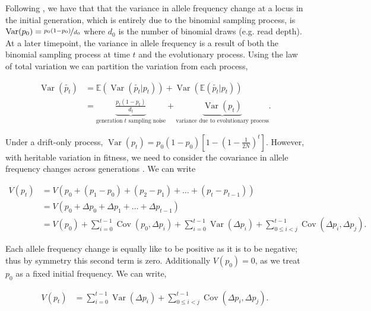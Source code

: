 \documentclass[11pt]{article}
\newcommand{\E}{\mathbb{E}}
\DeclareMathOperator{\var}{Var}
\DeclareMathOperator{\cov}{Cov}
\begin{document}
Following \textcite{Waples1989-sj}, we have that that the variance in allele
frequency change at a locus in the initial generation, which is entirely due to
the binomial sampling process, is $\var(p_0) = \nicefrac{p_0(1-p_0)}{d_0}$
where $d_0$ is the number of binomial draws (e.g. read depth). At a later
timepoint, the variance in allele frequency is a result of both the binomial
sampling process at time $t$ and the evolutionary process. Using the law of
total variation we can partition the variation from each process,

\begin{align}
  \var(\widetilde{p_t}) &= \E(\var(\widetilde{p_t} | p_t)) + \var(\E(\widetilde{p_t}|p_t)) \\
                        &= \underbrace{\frac{p_t(1-p_t)}{d_t}}_\text{generation $t$ sampling noise} + \underbrace{\var(p_t)}_\text{variance due to evolutionary process}.
\end{align}

Under a drift-only process, $\var(p_t) = p_0(1-p_0)\left[1- \left(1 -
\frac{1}{2N}\right)^t\right]$. However, with heritable variation in fitness, we
need to consider the covariance in allele frequency changes across generations
\parencite{Buffalo2019-io}. We can write

\begin{align}
  V(p_t) &= V\left(p_0 + (p_1 - p_0) + (p_2 - p_1) + \ldots + (p_t - p_{t-1}) \right) \\
         &= V\left(p_0 + \Delta p_0 + \Delta p_1 + \ldots + \Delta p_{t-1} \right) \\
         &= V(p_0) + \sum_{i=0}^{t-1} \cov(p_0, \Delta p_i) + \sum_{i=0}^{t-1} \var(\Delta p_i) + \sum_{0 \le i < j}^{t-1} \cov(\Delta p_i, \Delta p_j).
\end{align}
%

Each allele frequency change is equally like to be positive as it is to be
negative; thus by symmetry this second term is zero. Additionally $V(p_0) = 0$,
as we treat $p_0$ as a fixed initial frequency. We can write, 

\begin{align}
  V(p_t) &= \sum_{i=0}^{t-1} \var(\Delta p_i) + \sum_{0 \le i < j}^{t-1} \cov(\Delta p_i, \Delta p_j).
\end{align}
\end{document}
